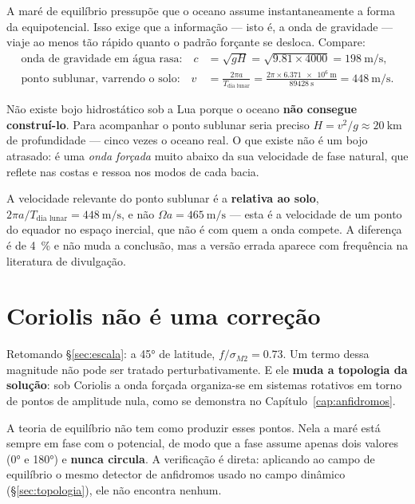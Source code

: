 \documentclass[11pt,a4paper,oneside]{report}
\theoremstyle{definition}
\theoremstyle{plain}
\theoremstyle{remark}
\begin{document}
A maré de equilíbrio pressupõe que o oceano assume instantaneamente a forma da
equipotencial. Isso exige que a informação — isto é, a onda de gravidade —
viaje ao menos tão rápido quanto o padrão forçante se desloca. Compare:
\begin{align}
\text{onda de gravidade em água rasa:}\quad
c&=\sqrt{gH}=\sqrt{\num{9.81}\times\num{4000}}
=\SI{198}{\meter\per\second},\\
\text{ponto sublunar, varrendo o solo:}\quad
v&=\frac{2\pi a}{T_{\text{dia lunar}}}
=\frac{2\pi\times\SI{6.371e6}{\meter}}{\SI{89428}{\second}}
=\SI{448}{\meter\per\second}.
\end{align}

\begin{caixa}
Não existe bojo hidrostático sob a Lua porque o oceano \textbf{não consegue
construí-lo}. Para acompanhar o ponto sublunar seria preciso
$H=v^{2}/g\approx\SI{20}{\kilo\meter}$ de profundidade — cinco vezes o oceano
real. O que existe não é um bojo atrasado: é uma \emph{onda forçada} muito
abaixo da sua velocidade de fase natural, que reflete nas costas e ressoa nos
modos de cada bacia.
\end{caixa}

\begin{alerta}
A velocidade relevante do ponto sublunar é a \textbf{relativa ao solo},
$2\pi a/T_{\text{dia lunar}}=\SI{448}{\meter\per\second}$, e não
$\Omega a=\SI{465}{\meter\per\second}$ — esta é a velocidade de um ponto do
equador no espaço inercial, que não é com quem a onda compete. A diferença é de
\SI{4}{\percent} e não muda a conclusão, mas a versão errada aparece com
frequência na literatura de divulgação.
\end{alerta}

\section{Coriolis não é uma correção}

Retomando \S\ref{sec:escala}: a \ang{45} de latitude, $f/\sigma_{M2}=\num{0.73}$.
Um termo dessa magnitude não pode ser tratado perturbativamente. E ele
\textbf{muda a topologia da solução}: sob Coriolis a onda forçada organiza-se em
sistemas rotativos em torno de pontos de amplitude nula, como se demonstra no
Capítulo~\ref{cap:anfidromos}.

A teoria de equilíbrio não tem como produzir esses pontos. Nela a maré está
sempre em fase com o potencial, de modo que a fase assume apenas dois valores
(\ang{0} e \ang{180}) e \textbf{nunca circula}. A verificação é direta:
aplicando ao campo de equilíbrio o mesmo detector de anfidromos usado no campo
dinâmico (\S\ref{sec:topologia}), ele não encontra nenhum.
\end{document}

